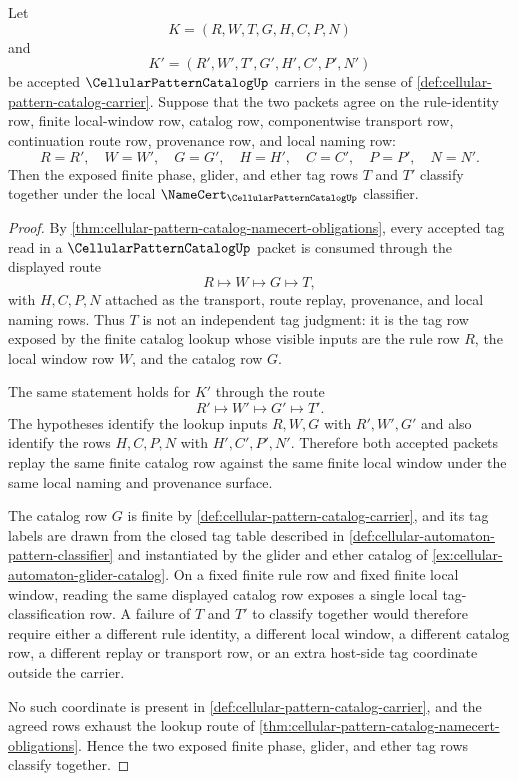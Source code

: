 \begin{lemma}
\label{lem:cellular-pattern-catalog-tag-lookup-determinacy}
Let
$$
K=(R,W,T,G,H,C,P,N)
$$
and
$$
K'=(R',W',T',G',H',C',P',N')
$$
be accepted $\CellularPatternCatalogUp$ carriers in the sense of \autoref{def:cellular-pattern-catalog-carrier}. Suppose that the two packets agree on the rule-identity row, finite local-window row, catalog row, componentwise transport row, continuation route row, provenance row, and local naming row:
$$
R=R',\quad W=W',\quad G=G',\quad H=H',\quad C=C',\quad P=P',\quad N=N'.
$$
Then the exposed finite phase, glider, and ether tag rows $T$ and $T'$ classify together under the local $\NameCert_{\CellularPatternCatalogUp}$ classifier.
\end{lemma}
\begin{proof}
By \autoref{thm:cellular-pattern-catalog-namecert-obligations}, every accepted tag read in a $\CellularPatternCatalogUp$ packet is consumed through the displayed route
$$
R \longmapsto W \longmapsto G \longmapsto T,
$$
with $H,C,P,N$ attached as the transport, route replay, provenance, and local naming rows. Thus $T$ is not an independent tag judgment: it is the tag row exposed by the finite catalog lookup whose visible inputs are the rule row $R$, the local window row $W$, and the catalog row $G$.

The same statement holds for $K'$ through the route
$$
R' \longmapsto W' \longmapsto G' \longmapsto T'.
$$
The hypotheses identify the lookup inputs $R,W,G$ with $R',W',G'$ and also identify the rows $H,C,P,N$ with $H',C',P',N'$. Therefore both accepted packets replay the same finite catalog row against the same finite local window under the same local naming and provenance surface.

The catalog row $G$ is finite by \autoref{def:cellular-pattern-catalog-carrier}, and its tag labels are drawn from the closed tag table described in \autoref{def:cellular-automaton-pattern-classifier} and instantiated by the glider and ether catalog of \autoref{ex:cellular-automaton-glider-catalog}. On a fixed finite rule row and fixed finite local window, reading the same displayed catalog row exposes a single local tag-classification row. A failure of $T$ and $T'$ to classify together would therefore require either a different rule identity, a different local window, a different catalog row, a different replay or transport row, or an extra host-side tag coordinate outside the carrier.

No such coordinate is present in \autoref{def:cellular-pattern-catalog-carrier}, and the agreed rows exhaust the lookup route of \autoref{thm:cellular-pattern-catalog-namecert-obligations}. Hence the two exposed finite phase, glider, and ether tag rows classify together.
\end{proof}

